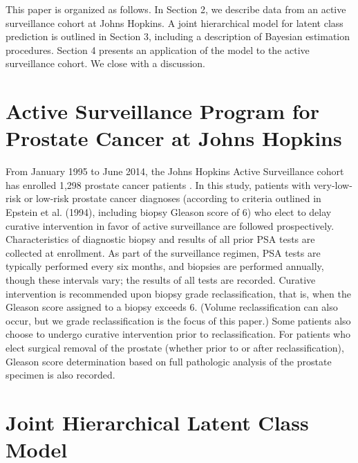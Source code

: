\documentclass[12pt, letterpaper]{article}
\begin{document}


This paper is organized as follows. In Section 2, we describe data from an active surveillance cohort at Johns Hopkins. A joint hierarchical model for latent class prediction is outlined in Section 3, including a description of Bayesian estimation procedures. Section 4 presents an application of the model to the active surveillance cohort. We close with a discussion.

\section{Active Surveillance Program for Prostate Cancer at Johns Hopkins}
From January 1995 to June 2014, the Johns Hopkins Active Surveillance cohort has enrolled 1,298 prostate cancer patients \cite{Tosoian2015}. In this study, patients with very-low-risk or low-risk prostate cancer diagnoses (according to criteria outlined in Epstein et al. (1994)\nocite{Epstein1994}, including biopsy Gleason score of 6) who elect to delay curative intervention in favor of active surveillance are followed prospectively. Characteristics of diagnostic biopsy and results of all prior PSA tests are collected at enrollment. As part of the surveillance regimen, PSA tests are typically performed every six months, and biopsies are performed annually, though these intervals vary; the results of all tests are recorded. Curative intervention is recommended upon biopsy grade reclassification, that is, when the Gleason score assigned to a biopsy exceeds 6. (Volume reclassification can also occur, but we grade reclassification is the focus of this paper.) Some patients also choose to undergo curative intervention prior to reclassification. For patients who elect surgical removal of the prostate (whether prior to or after reclassification), Gleason score determination based on full pathologic analysis of the prostate specimen is also recorded.

\section{Joint Hierarchical Latent Class Model}
\end{document}
